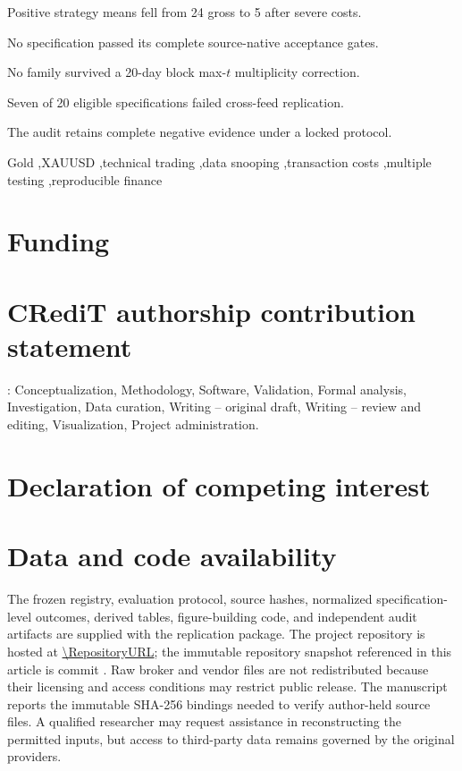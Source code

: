 \documentclass[a4paper,fleqn]{cas-sc}
\begin{document}
\begin{highlights}
\item Positive strategy means fell from 24 gross to 5 after severe costs.
\item No specification passed its complete source-native acceptance gates.
\item No family survived a 20-day block max-$t$ multiplicity correction.
\item Seven of 20 eligible specifications failed cross-feed replication.
\item The audit retains complete negative evidence under a locked protocol.
\end{highlights}

\begin{keywords}
Gold \sep XAUUSD \sep technical trading \sep data snooping \sep transaction costs \sep multiple testing \sep reproducible finance
\end{keywords}

\maketitle



\section*{Funding}
\FundingStatement

\section*{CRediT authorship contribution statement}
\AuthorName: Conceptualization, Methodology, Software, Validation, Formal analysis, Investigation, Data curation, Writing -- original draft, Writing -- review and editing, Visualization, Project administration.

\section*{Declaration of competing interest}
\InterestStatement

\section*{Data and code availability}
The frozen registry, evaluation protocol, source hashes, normalized specification-level outcomes, derived tables, figure-building code, and independent audit artifacts are supplied with the replication package. The project repository is hosted at \expandafter\url\expandafter{\RepositoryURL}; the immutable repository snapshot referenced in this article is commit \RepositoryCommit. Raw broker and vendor files are not redistributed because their licensing and access conditions may restrict public release. The manuscript reports the immutable SHA-256 bindings needed to verify author-held source files. A qualified researcher may request assistance in reconstructing the permitted inputs, but access to third-party data remains governed by the original providers.
\end{document}
